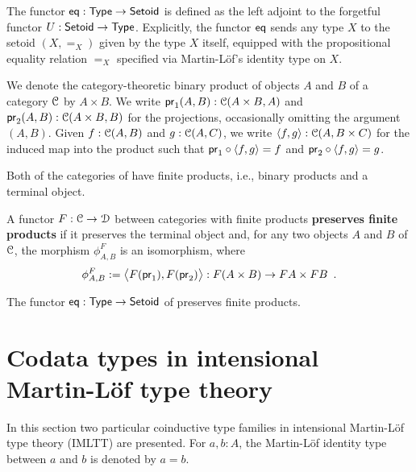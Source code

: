 \documentclass[a4paper,USenglish]{lipics}
\newcommand{\fat}[1]{\textbf{#1}}
\begin{document}
\begin{defn}
\label{def:eq}
 The functor $\eq : \Set\to\Setoid$ is defined as the left adjoint to the forgetful functor $U : \Setoid \to \Set$.
  Explicitly, the functor $\eq$ sends any type $X$ to the setoid $(X,=_X)$ given by the type $X$ itself, equipped
  with the propositional equality relation $=_X$ specified via Martin-L\"of's identity type on $X$.
\end{defn}


\begin{rem}
  We denote the category-theoretic binary product of objects $A$ and $B$ of a category $\C$ by $A\times B$.
  We write $\pr_1(A,B) : \C(A\times B, A)$ and $\pr_2(A,B) :\C(A\times B, B)$ for the projections, occasionally omitting the 
  argument $(A,B)$.
  Given $f : \C(A, B)$ and $g : \C(A,C)$, we write $\langle f,g\rangle : \C(A,B\times C)$ for the induced map into the product such that
  $\comp{\langle f,g\rangle}{\pr_1} = f$ and $\comp{\langle f,g\rangle}{\pr_2} = g$.
\end{rem}

Both of the categories of  have finite products, i.e., binary products and a terminal object.

\begin{defn}
\label{def:monoidal_functor}
 A functor $F:\C\to\D$ between categories with finite products \fat{preserves finite products} if it preserves the terminal object and,
 for any two objects $A$ and $B$ of $\C$,
  the morphism $\phi^F_{A,B}$ is an isomorphism, where
 \[ \phi^F_{A,B} := \bigl\langle F(\pr_1), F(\pr_2) \bigr\rangle : F(A \times B) \to FA\times FB \enspace . \] %
\end{defn}

\begin{ex}
  The functor $\eq: \Set \to \Setoid$ of  preserves finite products.
\end{ex}


\section{Codata types in intensional Martin-L\"of type theory}\label{sec:tri}

In this section two particular coinductive type families in intensional Martin-L\"of type theory (IMLTT) \parencite{martin_lof} are presented.
For $a,b : A$, the Martin-L\"of identity type between $a$ and $b$ is denoted by $a = b$.
\end{document}
